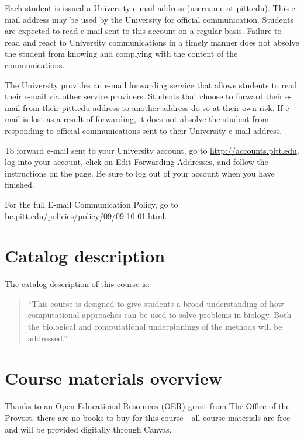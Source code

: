 \documentclass[
]{book}
\begin{document}
Each student is issued a University e-mail address (username at pitt.edu). This e-mail address may be used by the University for official communication. Students are expected to read e-mail sent to this account on a regular basis. Failure to read and react to University communications in a timely manner does not absolve the student from knowing and complying with the content of the communications.

The University provides an e-mail forwarding service that allows students to read their e-mail via other service providers. Students that choose to forward their e-mail from their pitt.edu address to another address do so at their own risk. If e-mail is lost as a result of forwarding, it does not absolve the student from responding to official communications sent to their University e-mail address.

To forward e-mail sent to your University account, go to \url{http://accounts.pitt.edu}, log into your account, click on Edit Forwarding Addresses, and follow the instructions on the page. Be sure to log out of your account when you have finished.

For the full E-mail Communication Policy, go to bc.pitt.edu/policies/policy/09/09-10-01.html.

\hypertarget{catalog-description}{%
\chapter{Catalog description}\label{catalog-description}}

The catalog description of this course is:

\begin{quote}
``This course is designed to give students a broad understanding of how computational approaches can be used to solve problems in biology. Both the biological and computational underpinnings of the methods will be addressed.''
\end{quote}

\hypertarget{course-materials-overview}{%
\chapter{Course materials overview}\label{course-materials-overview}}

Thanks to an Open Educational Resources (OER) grant from The Office of the Provost, there are no books to buy for this course - all course materials are free and will be provided digitally through Canvas.
\end{document}
